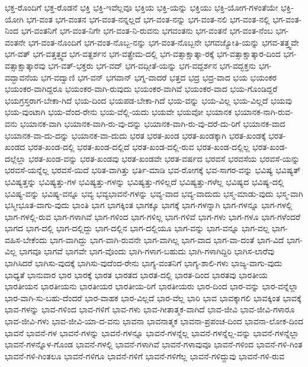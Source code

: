 {ಭಕ್ತ-ರೊಂದಿಗೆ
ಭಕ್ತ-ರೊಡನೆ
ಭಕ್ತಿ
ಭಕ್ತಿ-ಇವೆಲ್ಲವೂ
ಭಕ್ತಿಯ
ಭಕ್ತಿ-ಯನ್ನು
ಭಕ್ತಿಯು
ಭಕ್ತಿ-ಯೋಗ-ಗಳಂತೆಯೇ
ಭಕ್ತಿ-ಯೋಗಿ
ಭಗ-ವಂತ
ಭಗ-ವಂತನ
ಭಗ-ವಂತ-ನನ್ನಲ್ಲದೆ
ಭಗ-ವಂತ-ನನ್ನು
ಭಗ-ವಂತ-ನಲಿ
ಭಗ-ವಂತ-ನಲ್ಲಿ
ಭಗ-ವಂತ-ನಿಂದ
ಭಗ-ವಂತನಿಗೆ
ಭಗ-ವಂತ-ನಿಗೇ
ಭಗ-ವಂತ-ನಿ-ರುವನು
ಭಗವಂತನು
ಭಗ-ವಂತನೆ
ಭಗ-ವಂತ-ನೆಂಬ
ಭಗ-ವಂತನೇ
ಭಗ-ವಂತ-ನೊಂದಿಗೆ
ಭಗ-ವಂತ-ನೊಬ್ಬ-ನನ್ನು
ಭಗ-ವಂತ-ನೊಬ್ಬನೇ
ಭಗವಜ್ಯೋತಿ-ಯನ್ನು
ಭಗವ-ತತ್ತ್ವವೇ
ಭಗ-ವತ್
ಭಗ-ವತ್ತತ್ತ್ವದ
ಭಗ-ವತ್ದರ್ಶನ
ಭಗ-ವತ್ಪ್ರೇಮ-ದಲ್ಲಿ
ಭಗ-ವತ್ಸಾಕ್ಷಾತ್ಕಾ-ರಕ್ಕೆ
ಭಗ-ವತ್ಸಾಕ್ಷಾತ್ಕಾರ-ದಿಂದ
ಭಗ-ವತ್ಸಾಕ್ಷಾತ್ಕಾರವು
ಭಗ-ವತ್-ಭಕ್ತರು
ಭಗ-ವದ್
ಭಗ-ವದ್ಗೀತೆ-ಯನ್ನು
ಭಗ-ವದ್ದರ್ಶನ
ಭಗ-ವದ್ಭಕ್ತನು
ಭಗ-ವದ್ಭಾವನೆಯ
ಭಗ-ವದ್ವಾಣಿ
ಭಗ-ವನ್
ಭಗವಾನ್
ಭಗ್ನ-ವಾದರೆ
ಭತ್ತದ
ಭದ್ರ
ಭದ್ರ-ವಾದ
ಭಯ
ಭಯಂಕರ
ಭಯಂಕರ-ವಾಗಿದ್ದರೂ
ಭಯಂಕರ-ವಾಗಿ-ರುವುದು
ಭಯಂಕರ-ವಾಗಿವೆ
ಭಯಂಕರ-ವಾದ
ಭಯ-ಗೊಂಡಿದ್ದರೆ
ಭಯಗ್ರಸ್ತರಾಗ-ಬೇಕಾ-ಗಿದೆ
ಭಯ-ದಿಂದ
ಭಯಪಡ-ಬೇಕಾ-ಗಿದೆ
ಭಯ-ವನ್ನು
ಭಯ-ವಿಲ್ಲ
ಭಯ-ವಿಲ್ಲದೆ
ಭಯವು
ಭಯ-ವುಂಟಾಗಿ
ಭಯ-ವೆಂದ-ರೇನು
ಭಯ-ವೆಲ್ಲಿ-ಯದು
ಭಯವೇ
ಭಯವೋ
ಭಯಾನಕ
ಭಯಾನಕ-ನಾಗಿ-ರುವ-ವನು
ಭಯಾನಕ-ವಾಗಿ
ಭಯಾನಕ-ವಾಗಿ-ರು-ವು-ದನ್ನು
ಭಯಾನಕ-ವಾಗಿ-ರು-ವು-ದರೆ-ದು-ರಿಗೆ
ಭಯಾನಕ-ವಾದ
ಭಯಾನಕ-ವಾ-ದು-ದನ್ನು
ಭಯಾನಕ-ವಾ-ದುದು
ಭರತ
ಭರತ-ಖಂಡ
ಭರತ-ಖಂಡಕ್ಕಾಗಿ
ಭರತ-ಖಂಡಕ್ಕೆ
ಭರತ-ಖಂಡದ
ಭರತ-ಖಂಡ-ದಲ್ಲಿ
ಭರತ-ಖಂಡ-ದಲ್ಲಿದೆ
ಭರತ-ಖಂಡ-ದಲ್ಲಿ-ರುವ
ಭರತ-ಖಂಡ-ದಲ್ಲಿಲ್ಲ
ಭರತ-ಖಂಡ-ದಲ್ಲೆಲ್ಲಾ
ಭರತ-ಖಂಡ-ವನ್ನು
ಭರತ-ಖಂಡವು
ಭರತ-ಖಂಡವೇ
ಭರತ-ವರ್ಷದ
ಭರವಸೆ
ಭರವಸೆಯ
ಭರವಸೆ-ಯನ್ನು
ಭರವಸೆ-ಯನ್ನೆಲ್ಲ
ಭರವಸೆ-ಯಿದೆ
ಭರಿತ-ವಾಗಿತ್ತು
ಭರ್ತಿ-ಮಾಡಿ
ಭವ-ರೋಗಕ್ಕೆ
ಭವ-ಸಾಗರ-ವನ್ನು
ಭವಿಷ್ಯ
ಭವಿಷ್ಯತ್
ಭವಿಷ್ಯತ್ತನ್ನು
ಭವಿಷ್ಯತ್ತು-ಗಳ
ಭವಿಷ್ಯತ್ತು-ಗಳನ್ನು
ಭವಿಷ್ಯತ್ತು-ಗಳಿಲ್ಲದೆ
ಭವಿಷ್ಯತ್ತು-ಗಳೆಲ್ಲ
ಭವಿಷ್ಯದ
ಭವಿಷ್ಯ-ದಲ್ಲಿ
ಭವಿಷ್ಯ-ವನ್ನು
ಭವಿಷ್ಯ-ವನ್ನೂ
ಭವ್ಯ
ಭವ್ಯಭಾವನೆ-ಗಳನ್ನು
ಭವ್ಯ-ವಾದ
ಭವ್ಯ-ವಾದುದು
ಭಸ್ಮ-ಮಾಡು-ವುದು
ಭಸ್ಮ-ವಾಗಿ
ಭಸ್ಮೀಭೂತ-ವಾಗು-ವುದು
ಭಾಂತಿ
ಭಾಗ
ಭಾಗಕ್ಕಿಂತ
ಭಾಗಕ್ಕೂ
ಭಾಗಕ್ಕೆ
ಭಾಗ-ಗಳನ್ನಾಗಿ
ಭಾಗ-ಗಳನ್ನೂ
ಭಾಗ-ಗಳಲ್ಲಿ
ಭಾಗ-ಗಳಲ್ಲಿ-ರುವ
ಭಾಗ-ಗಳಾಗಿವೆ
ಭಾಗ-ಗಳಿಂದ
ಭಾಗ-ಗಳಿಲ್ಲ
ಭಾಗ-ಗಳಿವೆ
ಭಾಗ-ಗಳು
ಭಾಗ-ಗಳೂ
ಭಾಗ-ಗಳೆಂದರೆ
ಭಾಗದ
ಭಾಗ-ದಲ್ಲಿ
ಭಾಗ-ದಲ್ಲಿದ್ದು
ಭಾಗ-ದಲ್ಲಿನ
ಭಾಗ-ದಲ್ಲಿಯೂ
ಭಾಗ-ವನ್ನು
ಭಾಗ-ವನ್ನೂ
ಭಾಗ-ವಲ್ಲ
ಭಾಗ-ವಹಿಸ-ಬೇಕೆಂದು
ಭಾಗ-ವಾಗಿದ್ದು
ಭಾಗ-ವಾಗಿ-ರುವನೇ
ಭಾಗ-ವಾಗಿಲ್ಲ
ಭಾಗ-ವಾದ
ಭಾಗ-ವಾ-ದಂತೆ
ಭಾಗ-ವಿದೆ
ಭಾಗ-ವಿಲ್ಲ
ಭಾಗವೂ
ಭಾಗವೆ
ಭಾಗವೇ
ಭಾಗ-ವೊಂದು
ಭಾಗಿ-ಗಳಾಗ-ಬಹುದು
ಭಾಗಿ-ಗಳಾಗಿದ್ದಿರಿ
ಭಾಗಿಸ-ಲಾರೆವು
ಭಾಗಿಸಿದರೆ
ಭಾಗಿಸು-ವುದಕ್ಕೆ
ಭಾಗಿಸು-ವುದೆಂದ-ರೇನು
ಭಾಗ್ಯ-ವಂತನಿಗೆ
ಭಾಗ್ಯ-ಶಾಲಿ-ಗಳು
ಭಾಜ್ಯ-ವಾಗು-ವುದು
ಭಾಧ್ಯತೆ
ಭಾನುವಾರ
ಭಾರ
ಭಾರಕ್ಕೆ
ಭಾರತ
ಭಾರತದ
ಭಾರತ-ದಲ್ಲಿ
ಭಾರತ-ದಿಂದ
ಭಾರತವು
ಭಾರತೀಯ
ಭಾರತೀಯನ
ಭಾರತೀಯನು
ಭಾರತೀಯರ
ಭಾರತೀಯ-ರಿಗೆ
ಭಾರತೀಯರು
ಭಾರ-ದಿಂದ
ಭಾರ-ವನ್ನು
ಭಾರ-ವನ್ನೆಲ್ಲಾ
ಭಾರ-ವಾಗಿ-ಸು-ಬಹು-ದೆಂದರೆ
ಭಾರ-ವಾಹಕ
ಭಾರ-ವಿಲ್ಲದೆ
ಭಾರ-ವೆಲ್ಲ
ಭಾರಿ
ಭಾವ
ಭಾವಕ್ಕಾಗಲಿ
ಭಾವಕ್ಕಿಂತ
ಭಾವಕ್ಕೆ
ಭಾವ-ಗಳನ್ನು
ಭಾವ-ಗಳಿಂದ
ಭಾವ-ಗಳಿಗೆ
ಭಾವ-ಗಳು
ಭಾವ-ಗೀತಾತ್ಮಕ-ವಾಗಿದೆ
ಭಾವ-ಜೀವಿ
ಭಾವ-ಜೀವಿ-ಗಳಾರೂ
ಭಾವ-ಜೀವಿ-ಗಳು
ಭಾವ-ಜೀವಿ-ಯಾ-ದ-ವನು
ಭಾವನಾ
ಭಾವನಾತ್ಮಕ
ಭಾವನಾ-ಪ್ರಪಂಚ-ದಿಂದ
ಭಾವನಾ-ಲೋಕ-ದಿಂದ
ಭಾವನೆ
ಭಾವನೆ-ಗಳ
ಭಾವನೆ-ಗಳನ್ನು
ಭಾವನೆ-ಗಳನ್ನೂ
ಭಾವನೆ-ಗಳನ್ನೆಲ್ಲ
ಭಾವನೆ-ಗಳನ್ನೆಲ್ಲ-ವನ್ನು
ಭಾವನೆ-ಗಳನ್ನೆಲ್ಲಾ
ಭಾವನೆ-ಗಳನ್ನೊಳ-ಗೊಂಡ
ಭಾವನೆ-ಗಳಲ್ಲಿ
ಭಾವನೆ-ಗಳಾಗಿವೆ
ಭಾವನೆ-ಗಳಾವುವೂ
ಭಾವನೆ-ಗಳಿಂದ
ಭಾವನೆ-ಗಳಿ-ಗಿಂತ
ಭಾವನೆ-ಗಳಿ-ಗಿಂತಲೂ
ಭಾವನೆ-ಗಳಿಗೂ
ಭಾವನೆ-ಗಳಿಗೆ
ಭಾವನೆ-ಗಳಿಗೆಲ್ಲ
ಭಾವನೆ-ಗಳಿದ್ದುವು
ಭಾವನೆ-ಗಳಿ-ರುವ
}
